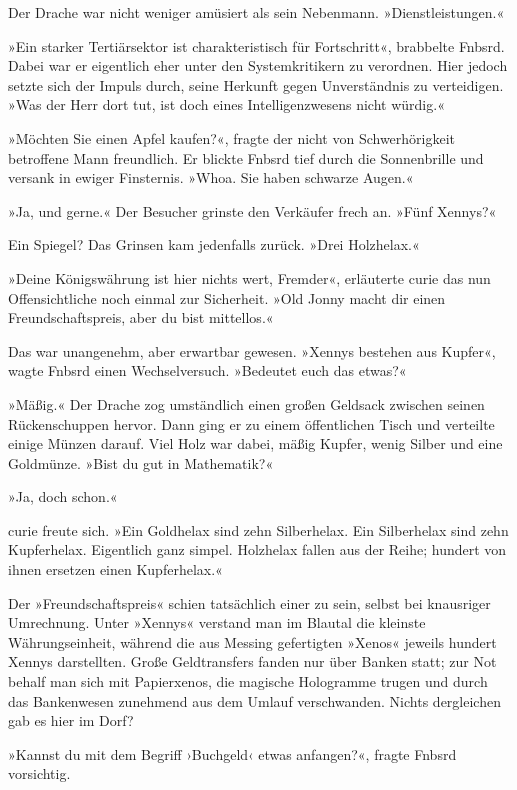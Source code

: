 Der Drache war nicht weniger amüsiert als sein Nebenmann. »Dienstleistungen.«

»Ein starker Tertiärsektor ist charakteristisch für Fortschritt«, brabbelte Fnbsrd. Dabei war er eigentlich eher unter den Systemkritikern zu verordnen. Hier jedoch setzte sich der Impuls durch, seine Herkunft gegen Unverständnis zu verteidigen. »Was der Herr dort tut, ist doch eines Intelligenzwesens nicht würdig.«

»Möchten Sie einen Apfel kaufen?«, fragte der nicht von Schwerhörigkeit betroffene Mann freundlich. Er blickte Fnbsrd tief durch die Sonnenbrille und versank in ewiger Finsternis. »Whoa. Sie haben schwarze Augen.«

»Ja, und gerne.« Der Besucher grinste den Verkäufer frech an. »Fünf Xennys?«

Ein Spiegel? Das Grinsen kam jedenfalls zurück. »Drei Holzhelax.«

»Deine Königswährung ist hier nichts wert, Fremder«, erläuterte curie das nun Offensichtliche noch einmal zur Sicherheit. »Old Jonny macht dir einen Freundschaftspreis, aber du bist mittellos.«

Das war unangenehm, aber erwartbar gewesen. »Xennys bestehen aus Kupfer«, wagte Fnbsrd einen Wechselversuch. »Bedeutet euch das etwas?«

»Mäßig.« Der Drache zog umständlich einen großen Geldsack zwischen seinen Rückenschuppen hervor. Dann ging er zu einem öffentlichen Tisch und verteilte einige Münzen darauf. Viel Holz war dabei, mäßig Kupfer, wenig Silber und eine Goldmünze. »Bist du gut in Mathematik?«

 »Ja, doch schon.« 

curie freute sich. »Ein Goldhelax sind zehn Silberhelax. Ein Silberhelax sind zehn Kupferhelax. Eigentlich ganz simpel. Holzhelax fallen aus der Reihe; hundert von ihnen ersetzen einen Kupferhelax.«

Der »Freundschaftspreis« schien tatsächlich einer zu sein, selbst bei knausriger Umrechnung. Unter »Xennys« verstand man im Blautal die kleinste Währungseinheit, während die aus Messing gefertigten »Xenos« jeweils hundert Xennys darstellten. Große Geldtransfers fanden nur über Banken statt; zur Not behalf man sich mit Papierxenos, die magische Hologramme trugen und durch das Bankenwesen zunehmend aus dem Umlauf verschwanden. Nichts dergleichen gab es hier im Dorf?

»Kannst du mit dem Begriff ›Buchgeld‹ etwas anfangen?«, fragte Fnbsrd vorsichtig.

